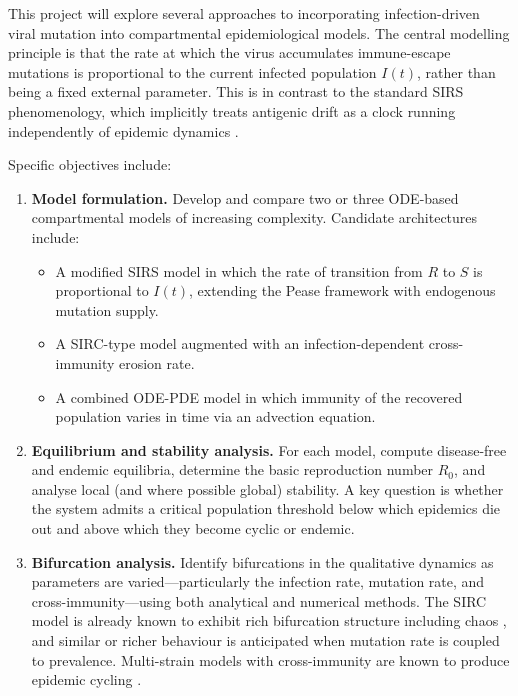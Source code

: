 \documentclass[12pt]{article}
\begin{document}
This project will explore several approaches to incorporating
infection-driven viral mutation into compartmental epidemiological models.
The central modelling principle is that the rate at which the virus accumulates
immune-escape mutations is proportional to the current infected population
$I(t)$, rather than being a fixed external parameter.
This is in contrast to the standard SIRS phenomenology, which implicitly treats
antigenic drift as a clock running independently of epidemic dynamics
\cite{pease1987, yaari2014}.

Specific objectives include:

\begin{enumerate}
  \item \textbf{Model formulation.} Develop and compare two or three
    ODE-based compartmental models of increasing complexity. Candidate
    architectures include:
    \begin{itemize}
      \item A modified SIRS model in which the rate of transition from $R$
        to $S$ is proportional to $I(t)$, extending the Pease framework
        \cite{pease1987} with endogenous mutation supply.
      \item A SIRC-type model \cite{casagrandi2006, li2017} augmented with
        an infection-dependent cross-immunity erosion rate.
      \item A combined ODE-PDE model in which immunity of the recovered population varies in time via an advection equation.
    \end{itemize}

  \item \textbf{Equilibrium and stability analysis.} For each model,
    compute disease-free and endemic equilibria, determine the basic
    reproduction number $R_0$, and analyse local (and where possible global)
    stability. A key question is whether the system admits a critical
    population threshold below which epidemics die out and above which they
    become cyclic or endemic.

  \item \textbf{Bifurcation analysis.} Identify bifurcations in the
    qualitative dynamics as parameters are varied---particularly the
    infection rate, mutation rate, and cross-immunity---using both analytical
    and numerical methods. The SIRC model is already known to exhibit
    rich bifurcation structure including chaos \cite{casagrandi2006}, and
    similar or richer behaviour is anticipated when mutation rate is coupled
    to prevalence. Multi-strain models with cross-immunity are known to
    produce epidemic cycling \cite{zhang2016}.


\end{enumerate}
\end{document}
